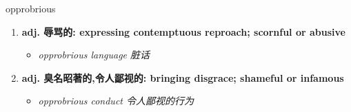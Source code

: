 
\begin{frame}
{\huge opprobrious}
\begin{center}
\begin{enumerate}\Large
  \item \textbf{adj. 辱骂的: expressing contemptuous reproach; scornful or abusive}
  \begin{itemize}
    \item \em{\Large{opprobrious language 脏话}}
  \end{itemize}
  \item \textbf{adj. 臭名昭著的,令人鄙视的: bringing disgrace; shameful or infamous}
  \begin{itemize}
    \item \em{\Large{opprobrious conduct 令人鄙视的行为}}
  \end{itemize}
\end{enumerate}
\end{center}
\end{frame}
